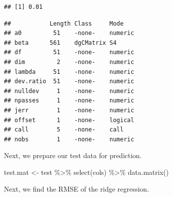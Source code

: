 \documentclass[
]{book}
\newenvironment{Shaded}{\begin{snugshade}}{\end{snugshade}}
\newcommand{\AttributeTok}[1]{\textcolor[rgb]{0.77,0.63,0.00}{#1}}
\newcommand{\FloatTok}[1]{\textcolor[rgb]{0.00,0.00,0.81}{#1}}
\newcommand{\FunctionTok}[1]{\textcolor[rgb]{0.00,0.00,0.00}{#1}}
\newcommand{\NormalTok}[1]{#1}
\newcommand{\OtherTok}[1]{\textcolor[rgb]{0.56,0.35,0.01}{#1}}
\newcommand{\SpecialCharTok}[1]{\textcolor[rgb]{0.00,0.00,0.00}{#1}}
\begin{document}
\begin{Shaded}
\end{Shaded}

\begin{verbatim}
## [1] 0.01
\end{verbatim}

\begin{Shaded}
\end{Shaded}

\begin{verbatim}
##           Length Class     Mode   
## a0         51    -none-    numeric
## beta      561    dgCMatrix S4     
## df         51    -none-    numeric
## dim         2    -none-    numeric
## lambda     51    -none-    numeric
## dev.ratio  51    -none-    numeric
## nulldev     1    -none-    numeric
## npasses     1    -none-    numeric
## jerr        1    -none-    numeric
## offset      1    -none-    logical
## call        5    -none-    call   
## nobs        1    -none-    numeric
\end{verbatim}

Next, we prepare our test data for prediction.

\begin{Shaded}
\begin{Highlighting}[]
\NormalTok{test.mat }\OtherTok{\textless{}{-}}\NormalTok{ test }\SpecialCharTok{\%\textgreater{}\%} \FunctionTok{select}\NormalTok{(cols) }\SpecialCharTok{\%\textgreater{}\%} \FunctionTok{data.matrix}\NormalTok{()}
\end{Highlighting}
\end{Shaded}

Next, we find the RMSE of the ridge regression.

\begin{Shaded}
\end{Shaded}
\end{document}
